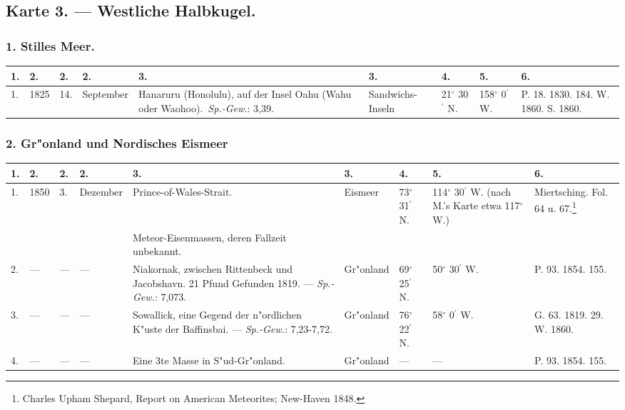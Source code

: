 \documentclass[a4paper, 8pt, oneside, polutonikogreek, german]{article}
\begin{document}
\subsection{Karte 3. --- Westliche Halbkugel.}
\subsubsection{1. Stilles Meer.}
\begin{table}[H]
    \centering
    \footnotesize
    \begin{longtable}{|p{3mm}|p{5mm}|p{4mm}|p{13mm}|p{22mm}|p{14mm}|p{10mm}|p{10mm}|p{13mm}|}
    \hline
        1. & 2. & 2. & 2. & 3. & 3. & 4. & 5. & 6. \\ \hline
        1. & 1825 & 14. & September & Hanaruru (Honolulu), auf der Insel Oahu (Wahu oder Waohoo). \emph{Sp.-Gew.}: 3,39. & Sandwichs-Inseln & 21$^\circ$ 30$^\prime$ N. & 158$^\circ$ 0$^\prime$ W. & P. 18. 1830. 184. W. 1860. S. 1860. \\ \hline
    \end{longtable}
\end{table}
\subsubsection{2. Gr"onland und Nordisches Eismeer}
\begin{table}[H]
    \centering
    \footnotesize
    \begin{longtable}{|p{3mm}|p{5mm}|p{3mm}|p{11mm}|p{28mm}|p{12mm}|p{10mm}|p{12mm}|p{14mm}|}
    \hline
        1. & 2. & 2. & 2. & 3. & 3. & 4. & 5. & 6. \\ \hline
        1. & 1850 & 3. & Dezember & Prince-of-Wales-Strait. & Eismeer & 73$^\circ$ 31$^\prime$ N. & 114$^\circ$ 30$^\prime$ W. (nach M.'s Karte etwa 117$^\circ$ W.) & Miertsching. Fol. 64 u. 67.\footnote{Charles Upham Shepard, Report on American Meteorites; New-Haven 1848.} \\ \hline
          &   &   &   & Meteor-Eisenmassen, deren Fallzeit unbekannt. &   &   &   &   \\ \hline
        2. & --- & --- & --- & Niakornak, zwischen Rittenbeck und Jacobshavn. 21 Pfund Gefunden 1819. --- \emph{Sp.-Gew.}: 7,073. & Gr"onland & 69$^\circ$ 25$^\prime$ N. & 50$^\circ$ 30$^\prime$ W. & P. 93. 1854. 155. \\ \hline
        3. & --- & --- & --- & Sowallick, eine Gegend der n"ordlichen K"uste der Baffinsbai. --- \emph{Sp.-Gew.}: 7,23-7,72. & Gr"onland & 76$^\circ$ 22$^\prime$ N. & 58$^\circ$ 0$^\prime$ W. & G. 63. 1819. 29. W. 1860. \\ \hline
        4. & --- & --- & --- & Eine 3te Masse in S"ud-Gr"onland. & Gr"onland & --- & --- & P. 93. 1854. 155. \\ \hline
    \end{longtable}
\end{table}
\end{document}
